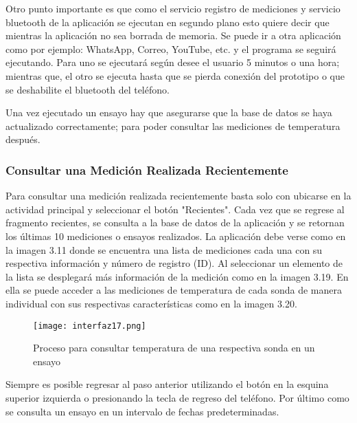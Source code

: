 \par \noindent
Otro punto importante es que como el servicio registro de mediciones y servicio bluetooth de la aplicación se ejecutan en segundo plano esto quiere decir que mientras la aplicación no sea borrada de memoria. Se puede ir a otra aplicación como por ejemplo: WhatsApp, Correo, YouTube, etc. y el programa se seguirá ejecutando. Para uno se ejecutará según desee el usuario 5 minutos o una hora; mientras que, el otro se ejecuta hasta que se pierda conexión del prototipo o que se deshabilite el bluetooth del teléfono.

\par \noindent
Una vez ejecutado un ensayo hay que asegurarse que la base de datos se haya actualizado correctamente; para poder consultar las mediciones de temperatura después.

\subsubsection{Consultar una Medición Realizada Recientemente}

\par 
Para consultar una medición realizada recientemente basta solo con ubicarse en la actividad principal y seleccionar el botón "Recientes". Cada vez que se regrese al fragmento recientes, se consulta a la base de datos de la aplicación y se retornan los últimas 10 mediciones o ensayos realizados. La aplicación debe verse como en la imagen 3.11 donde se encuentra una lista de mediciones cada una con su respectiva información y número de registro (ID). Al seleccionar un elemento de la lista se desplegará más información de la medición como en la imagen 3.19. En ella se puede acceder a las mediciones de temperatura de cada sonda de manera individual con sus respectivas características como en la imagen 3.20.

\begin{figure}[H]
	\centering
	\texttt{[image: interfaz17.png]}
	\caption{Proceso para consultar temperatura de una respectiva sonda en un ensayo}
\end{figure}

\par \noindent
Siempre es posible regresar al paso anterior utilizando el botón en la esquina superior izquierda o presionando la tecla de regreso del teléfono. Por último como se consulta un ensayo en un intervalo de fechas predeterminadas. 

\clearpage

